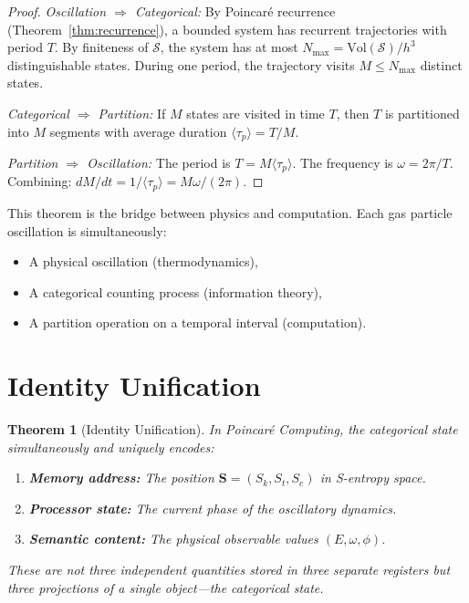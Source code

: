 \documentclass[twocolumn,10pt,a4paper]{article}
\theoremstyle{plain}
\newtheorem{theorem}{Theorem}[section]
\theoremstyle{definition}
\theoremstyle{remark}
\newcommand{\Sspace}{\mathcal{S}}
\newcommand{\Sk}{S_k}
\newcommand{\St}{S_t}
\newcommand{\Se}{S_e}
\newcommand{\Scoord}{\mathbf{S}}
\newcommand{\taup}{\tau_p}
\begin{document}
\begin{proof}
\emph{Oscillation $\Rightarrow$ Categorical:} By Poincar\'{e} recurrence (Theorem~\ref{thm:recurrence}), a bounded system has recurrent trajectories with period $T$. By finiteness of $\Sspace$, the system has at most $N_{\max} = \mathrm{Vol}(\Sspace)/h^3$ distinguishable states. During one period, the trajectory visits $M \leq N_{\max}$ distinct states.

\emph{Categorical $\Rightarrow$ Partition:} If $M$ states are visited in time $T$, then $T$ is partitioned into $M$ segments with average duration $\langle\taup\rangle = T/M$.

\emph{Partition $\Rightarrow$ Oscillation:} The period is $T = M\langle\taup\rangle$. The frequency is $\omega = 2\pi/T$. Combining: $dM/dt = 1/\langle\taup\rangle = M\omega/(2\pi)$.
\end{proof}

This theorem is the bridge between physics and computation. Each gas particle oscillation is simultaneously:
\begin{itemize}
    \item A physical oscillation (thermodynamics),
    \item A categorical counting process (information theory),
    \item A partition operation on a temporal interval (computation).
\end{itemize}

\section{Identity Unification}
\label{sec:identity}

\begin{theorem}[Identity Unification]
\label{thm:identity}
In Poincar\'{e} Computing, the categorical state simultaneously and uniquely encodes:
\begin{enumerate}
    \item \textbf{Memory address:} The position $\Scoord = (\Sk, \St, \Se)$ in S-entropy space.
    \item \textbf{Processor state:} The current phase of the oscillatory dynamics.
    \item \textbf{Semantic content:} The physical observable values $(E, \omega, \phi)$.
\end{enumerate}
These are not three independent quantities stored in three separate registers but \emph{three projections of a single object}---the categorical state.
\end{theorem}
\end{document}
